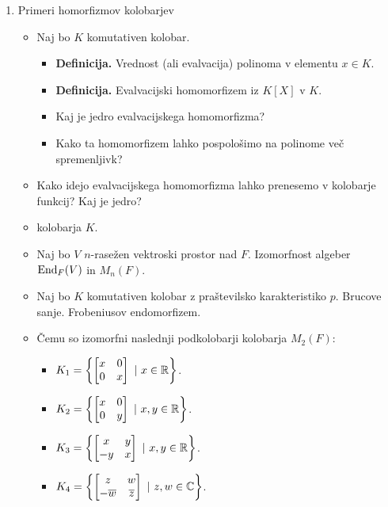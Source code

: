 \begin{enumerate}
    \newpage
    \item Primeri homorfizmov kolobarjev
    \begin{itemize}
        \item Naj bo $K$ komutativen kolobar. 
        \begin{itemize}
            \item \colorbox{purple!30}{\textbf{Definicija.}} Vrednost (ali evalvacija) polinoma v elementu $x \in K$.
            \item \colorbox{purple!30}{\textbf{Definicija.}} Evalvacijski homomorfizem iz $K[X]$ v $K$.
            \item Kaj je jedro evalvacijskega homomorfizma?
            \item Kako ta homomorfizem lahko pospološimo na polinome več spremenljivk?
        \end{itemize}
        \item Kako idejo evalvacijskega homomorfizma lahko prenesemo v kolobarje funkcij? Kaj je jedro?
        \item {} kolobarja $K$.
        \item Naj bo $V$ $n$-rasežen vektroski prostor nad $F$. Izomorfnost algeber $\operatorname{End}_F(V)$ in $M_n(F)$.
        \item Naj bo $K$ komutativen kolobar z praštevilsko karakteristiko $p$. Brucove sanje. Frobeniusov endomorfizem.
        \item Čemu so izomorfni naslednji podkolobarji kolobarja $M_2(F)$:
        \begin{itemize}
            \item $K_1 = \left\{\begin{bmatrix}
            x & 0 \\ 0 & x
            \end{bmatrix} \ | \ x \in \mathbb{R}\right\}$.
            \item $K_2 = \left\{\begin{bmatrix}
            x & 0 \\ 0 & y
            \end{bmatrix} \ | \ x,y \in \mathbb{R}\right\}$.
            \item $K_3 = \left\{\begin{bmatrix}
            x & y \\ -y & x
            \end{bmatrix} \ | \ x, y \in \mathbb{R}\right\}$.
            \item $K_4 = \left\{\begin{bmatrix}
            z & w \\ -\overline{w} & \overline{z}
            \end{bmatrix} \ | \ z, w \in \mathbb{C}\right\}$.
        \end{itemize}
    \end{itemize}
\end{enumerate}